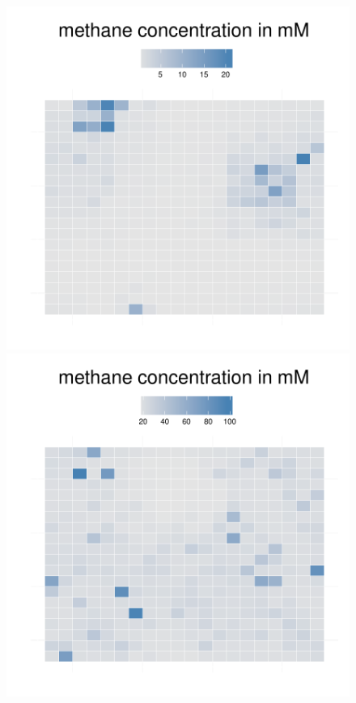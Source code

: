 \begin{figure}[h!]
{\begin{minipage}[t]{0.3\textwidth}
  \end{minipage}
  \begin{minipage}[t]{0.3\textwidth}
    \includegraphics[width=\textwidth]{../results/barkeri_beijerinckii_20x20_seed6764_meth100.pdf}
  \end{minipage}
  \begin{minipage}[t]{0.3\textwidth}
    \includegraphics[width=\textwidth]{../results/barkeri_beijerinckii_20x20_seed6764_meth150.pdf}

\end{minipage}}
\end{figure}
